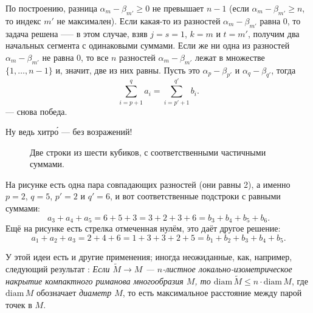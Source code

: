 По построению, разница $\alpha_m-\beta_{m'}\ge 0$ не превышает $n-1$ 
(если $\alpha_m-\beta_{m'}\ge n$, то индекс $m'$ не максимален).
Если какая-то из разностей $\alpha_m-\beta_{m'}$ равна $0$, то задача решена ----- в этом случае, взяв $j=s=1$, $k=m$ и $t=m'$, получим два начальных сегмента с одинаковыми суммами.
Если же ни одна из разностей $\alpha_m-\beta_{m'}$ не равна $0$, то все $n$ разностей 
$\alpha_m-\beta_{m'}$ лежат в множестве $\{1,\dots,n-1\}$ и, значит, две из них равны.
Пусть это $\alpha_p-\beta_{p'}$ и $\alpha_q-\beta_{q'}$, тогда 
\[\sum_{i=p+1}^qa_i=\sum_{i=p'+1}^{q'}b_i.\]
--- снова победа.

Ну ведь хитр\'{о} --- без возражений!

\begin{figure}[ht!]
\centering
{}
\caption{Две строки из шести кубиков, с соответственными частичными суммами.}
\label{pic:kubiki}
\end{figure}

На рисунке есть одна пара совпадающих разностей (они равны 2), а именно $p=2$, $q=5$, $p'=2$ и $q'=6$, и
вот соответственные подстроки с равными суммами:
\[a_3+a_4+a_5=6+5+3=3+2+3+6=b_3+b_4+b_5+b_6.\]
Ещё на рисунке есть стрелка отмеченная нулём, это даёт другое решение:
\[a_1+a_2+a_3=2+4+6=1+3+3+2+5=b_1+b_2+b_3+b_4+b_5.\]

\begin{addedbytheeditors}
У этой идеи есть и другие применения; иногда неожиданные, как, например, следующий результат \cite{petrunin}:
\textit{Если $\tilde M\to M$ --- $n$-листное локально-изометрическое накрытие компактного риманова многообразия $M$, то $\mathrm{diam}\, \tilde M\le n\cdot \mathrm{diam}\, M$}, где $\mathrm{diam}\, M$ обозначает \textit{диаметр $M$}, то есть максимальное расстояние между парой точек в $M$.\pr
\end{addedbytheeditors}


